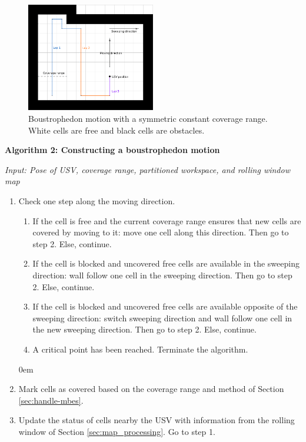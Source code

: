 \begin{figure}[h!]
	\centering
	\includegraphics[width=0.5\textwidth]{fig/ccpp/bm_desc}
	\caption[Boustrophedon motion with a symmetric constant coverage range.]{Boustrophedon motion with a symmetric constant coverage range. White cells are free and black cells are obstacles.}
	\label{fig:bm_dir}
\end{figure}

\begin{tcolorbox}

\textbf{Algorithm 2: Constructing a boustrophedon motion}

\emph{Input: Pose of USV, coverage range, partitioned workspace, and rolling window map}

\begin{enumerate}
\itemsep0em

\item Check one step along the moving direction.
\begin{enumerate}
\itemsep0em

\item If the cell is free and the current coverage range ensures that new cells are covered by moving to it: move one cell along this direction. Then go to step 2. Else, continue.

\item If the cell is blocked and uncovered free cells are available in the sweeping direction: wall follow one cell in the sweeping direction. Then go to step 2. Else, continue.

\item If the cell is blocked and uncovered free cells are available opposite of the sweeping direction: switch sweeping direction and wall follow one cell in the new sweeping direction. Then go to step 2. Else, continue.

\item A critical point has been reached. Terminate the algorithm.

\end{enumerate}
\itemsep0em

\item Mark cells as covered based on the coverage range and method of Section \ref{sec:handle-mbes}.

\item Update the status of cells nearby the USV with information from the rolling window of Section \ref{sec:map_processing}. Go to step 1.

\end{enumerate}

\end{tcolorbox}



